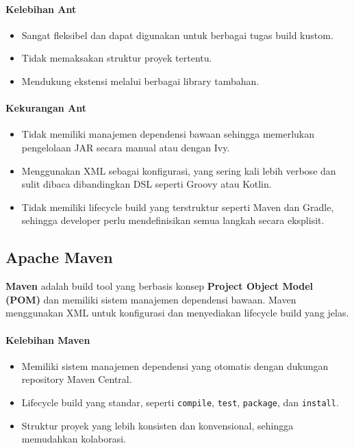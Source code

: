 \paragraph{Kelebihan Ant}
\begin{itemize}
	\item Sangat fleksibel dan dapat digunakan untuk berbagai tugas build kustom.
	\item Tidak memaksakan struktur proyek tertentu.
	\item Mendukung ekstensi melalui berbagai library tambahan.
\end{itemize}

\paragraph{Kekurangan Ant}
\begin{itemize}
	\item Tidak memiliki manajemen dependensi bawaan sehingga memerlukan pengelolaan JAR secara manual atau dengan Ivy.
	\item Menggunakan XML sebagai konfigurasi, yang sering kali lebih verbose dan sulit dibaca dibandingkan DSL seperti Groovy atau Kotlin.
	\item Tidak memiliki lifecycle build yang terstruktur seperti Maven dan Gradle, sehingga developer perlu mendefinisikan semua langkah secara eksplisit.
\end{itemize}

\subsection{Apache Maven}
\textbf{Maven} adalah build tool yang berbasis konsep \textbf{Project Object Model (POM)} dan memiliki sistem manajemen dependensi bawaan. Maven menggunakan XML untuk konfigurasi dan menyediakan lifecycle build yang jelas.

\paragraph{Kelebihan Maven}
\begin{itemize}
	\item Memiliki sistem manajemen dependensi yang otomatis dengan dukungan repository Maven Central.
	\item Lifecycle build yang standar, seperti \texttt{compile}, \texttt{test}, \texttt{package}, dan \texttt{install}.
	\item Struktur proyek yang lebih konsisten dan konvensional, sehingga memudahkan kolaborasi.
\end{itemize}

